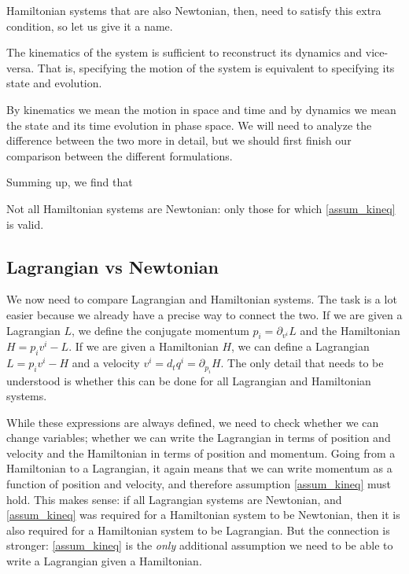 Hamiltonian systems that are also Newtonian, then, need to satisfy this extra condition, so let us give it a name.
\renewcommand{\theassump}{KE}
\begin{assump}\label{assum_kineq}
	The kinematics of the system is sufficient to reconstruct its dynamics and vice-versa. That is, specifying the motion of the system is equivalent to specifying its state and evolution.
\end{assump}
\renewcommand{\theassump}{\Roman{assump}}
By kinematics we mean the motion in space and time and by dynamics we mean the state and its time evolution in phase space. We will need to analyze the difference between the two more in detail, but we should first finish our comparison between the different formulations.

Summing up, we find that
\begin{insight}
	Not all Hamiltonian systems are Newtonian: only those for which  \ref{assum_kineq} is valid.
\end{insight}

\subsection{Lagrangian vs Newtonian}

We now need to compare Lagrangian and Hamiltonian systems. The task is a lot easier because we already have a precise way to connect the two. If we are given a Lagrangian $L$, we define the conjugate momentum $p_i = \partial_{v^i} L$ and the Hamiltonian $H = p_i v^i - L$. If we are given a Hamiltonian $H$, we can define a Lagrangian $L = p_i v^i - H$ and a velocity $v^i = d_t q^i = \partial_{p_i} H$. The only detail that needs to be understood is whether this can be done for all Lagrangian and Hamiltonian systems.

While these expressions are always defined, we need to check whether we can change variables; whether we can write the Lagrangian in terms of position and velocity and the Hamiltonian in terms of position and momentum. Going from a Hamiltonian to a Lagrangian, it again means that we can write momentum as a function of position and velocity, and therefore assumption \ref{assum_kineq} must hold. This makes sense: if all Lagrangian systems are Newtonian, and \ref{assum_kineq} was required for a Hamiltonian system to be Newtonian, then it is also required for a Hamiltonian system to be Lagrangian. But the connection is stronger: \ref{assum_kineq} is the \emph{only} additional assumption we need to be able to write a Lagrangian given a Hamiltonian.

